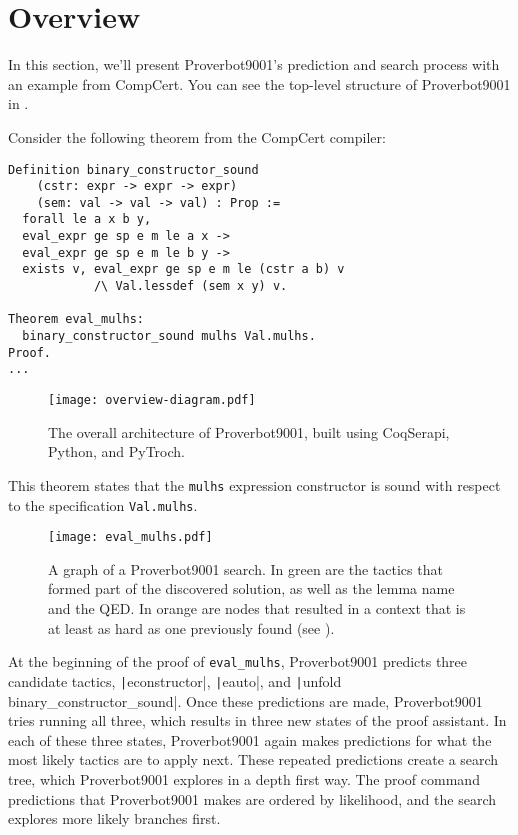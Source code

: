 \documentclass[sigplan,screen]{acmart}
\newcommand{\name}{Proverbot9001\xspace}
\newcommand{\coqinline}[1]{\texttt|#1|}
\renewcommand{\>}{\quad}
\begin{document}
 \section{Overview}
\label{sec:overview}

In this section, we'll present \name's prediction and search process
  with an example from CompCert.
You can see the top-level structure of \name in .

Consider the following theorem from the CompCert compiler:
{
\footnotesize
\begin{verbatim}
Definition binary_constructor_sound
    (cstr: expr -> expr -> expr)
    (sem: val -> val -> val) : Prop :=
  forall le a x b y,
  eval_expr ge sp e m le a x ->
  eval_expr ge sp e m le b y ->
  exists v, eval_expr ge sp e m le (cstr a b) v
            /\ Val.lessdef (sem x y) v.

Theorem eval_mulhs:
  binary_constructor_sound mulhs Val.mulhs.
Proof.
...
\end{verbatim}
}

\begin{figure}
\texttt{[image: overview-diagram.pdf]}
\caption{The overall architecture of \name, built using CoqSerapi, Python, and PyTroch.}
\label{fig:overview-diagram}
\end{figure}

This theorem states that the \verb-mulhs- expression constructor is
sound with respect to the specification \texttt{Val.mulhs}.

\begin{figure}
  \texttt{[image: eval\_mulhs.pdf]}
  \caption{A graph of a \name{} search. In green are the tactics that
    formed part of the discovered solution, as well as the lemma name
    and the QED. In orange are nodes that resulted in a context that
    is at least as hard as one previously found (see ).}
\label{fig:evalmulhs-searchgraph}
\end{figure}

At the beginning of the proof of \texttt{eval_mulhs},
  \name{} predicts three candidate tactics,
  \coqinline{econstructor}, \coqinline{eauto},
  and \coqinline{unfold binary_constructor_sound}.
Once these predictions are made, \name{} tries running all three,
  which results in three new states of the proof assistant.
In each of these three states,
  \name{} again makes predictions for what the most likely tactics are to apply next.
These repeated predictions create a search tree,
  which \name{} explores in a depth first way.
The proof command predictions that \name{} makes are ordered by likelihood,
  and the search explores more likely branches first.
\end{document}
